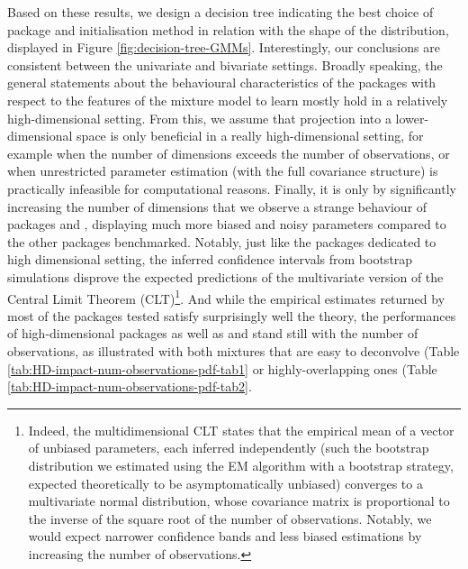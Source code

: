 Based on these results, we design a decision tree indicating the best choice of package and initialisation method in relation with the shape of the distribution, displayed in Figure
\ref{fig:decision-tree-GMMs}. Interestingly, our conclusions are consistent between the univariate and bivariate settings.
\color{green} Broadly speaking, the general statements about the behavioural characteristics of the packages with respect to the features of the mixture model to learn mostly hold in a relatively high-dimensional setting. From this, we assume that projection into a lower-dimensional space is only beneficial in a really high-dimensional setting, for example when the number of dimensions exceeds the number of observations, or when unrestricted parameter estimation (with the full covariance structure) is practically infeasible for computational reasons. Finally, it is only by significantly increasing the number of dimensions that we observe a strange behaviour of packages  and , displaying much more biased and noisy parameters compared to the other packages benchmarked. Notably, just like the packages dedicated to high dimensional setting, the inferred confidence intervals from bootstrap simulations disprove the expected predictions of the multivariate version of the Central
Limit Theorem (CLT)\footnote{Indeed, the multidimensional CLT states that the empirical mean of a vector of unbiased parameters, each inferred independently (such the bootstrap distribution we estimated using the EM algorithm with a bootstrap strategy, expected theoretically to be asymptomatically unbiased) converges to a multivariate normal distribution, whose covariance matrix is proportional to the inverse of the square root of the number of observations. Notably, we would expect narrower confidence bands and less biased estimations by increasing the number of observations.}. And while the empirical estimates returned by most of the packages tested satisfy surprisingly well the theory, the performances of high-dimensional packages as well as  and  stand still with the number of observations, as illustrated with both mixtures that are easy to deconvolve (Table \ref{tab:HD-impact-num-observations-pdf-tab1} or highly-overlapping ones (Table \ref{tab:HD-impact-num-observations-pdf-tab2}. \color{black}


